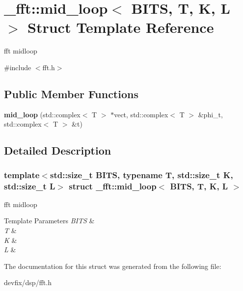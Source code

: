 \hypertarget{struct__fft_1_1mid__loop}{}\section{\+\_\+fft\+:\+:mid\+\_\+loop$<$ B\+I\+TS, T, K, L $>$ Struct Template Reference}
\label{struct__fft_1_1mid__loop}


fft midloop  




{\ttfamily \#include $<$fft.\+h$>$}

\subsection*{Public Member Functions}
\begin{DoxyCompactItemize}
\item 
\mbox{\label{struct__fft_1_1mid__loop_ac959fe04f9bd2a9bbeaf7889c03780b6}} 
{\bfseries mid\+\_\+loop} (std\+::complex$<$ T $>$ $\ast$vect, std\+::complex$<$ T $>$ \&phi\+\_\+t, std\+::complex$<$ T $>$ \&t)
\end{DoxyCompactItemize}


\subsection{Detailed Description}
\subsubsection*{template$<$std\+::size\+\_\+t B\+I\+TS, typename T, std\+::size\+\_\+t K, std\+::size\+\_\+t L$>$\newline
struct \+\_\+fft\+::mid\+\_\+loop$<$ B\+I\+T\+S, T, K, L $>$}

fft midloop 


\begin{DoxyTemplParams}{Template Parameters}
{\em B\+I\+TS} & \\
\hline
{\em T} & \\
\hline
{\em K} & \\
\hline
{\em L} & \\
\hline
\end{DoxyTemplParams}


The documentation for this struct was generated from the following file\+:\begin{DoxyCompactItemize}
\item 
devfix/dsp/fft.\+h\end{DoxyCompactItemize}
